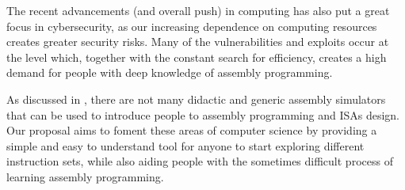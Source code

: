 The recent advancements (and overall push) in computing has also put a great focus in cybersecurity, as our increasing dependence on computing resources creates greater security risks. Many of the vulnerabilities and exploits occur at the  level which, together with the constant search for efficiency, creates a high demand for people with deep knowledge of \gls{assembly} programming.

As discussed in , there are not many didactic and generic \gls{assembly} simulators that can be used to introduce people to \gls{assembly} programming and \glspl{ISA} design. Our proposal aims to foment these areas of computer science by providing a simple and easy to understand tool for anyone to start exploring different instruction sets, while also aiding people with the sometimes difficult process of learning \gls{assembly} programming.
